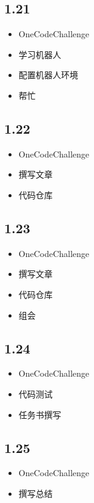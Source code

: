 \documentclass[UTF8]{ctexart}
\begin{document}
\subsection*{1.21}
\begin{itemize}
    \item OneCodeChallenge
    \item 学习机器人
    \item 配置机器人环境
    \item 帮忙
\end{itemize}

\subsection*{1.22}
\begin{itemize}
    \item OneCodeChallenge
    \item 撰写文章
    \item 代码仓库
\end{itemize}

\subsection*{1.23}
\begin{itemize}
    \item OneCodeChallenge
    \item 撰写文章
    \item 代码仓库
    \item 组会
\end{itemize}

\subsection*{1.24}
\begin{itemize}
    \item OneCodeChallenge
    \item 代码测试
    \item 任务书撰写
\end{itemize}

\subsection*{1.25}
\begin{itemize}
    \item OneCodeChallenge
    \item 撰写总结
\end{itemize}
\end{document}
